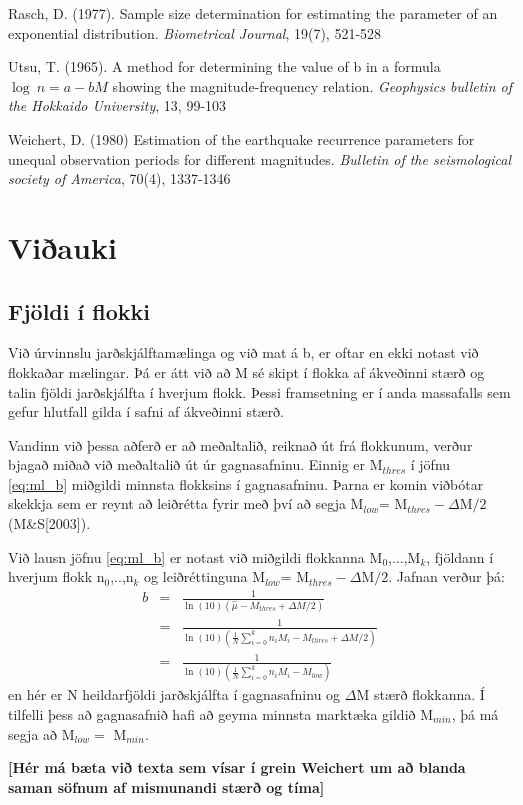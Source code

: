 \documentclass[10pt,a4paper,titlepage,twoside]{article}
\newcommand{\note}[1]{\textcolor{ymagray}{\textbf{[#1]}}}
\begin{document}
Rasch, D. (1977). Sample size determination for estimating the parameter of an exponential distribution. \textit{Biometrical Journal}, 19(7), 521-528

Utsu, T. (1965). A method for determining the value of b in a formula $\log~n=a-bM$ showing the magnitude-frequency relation. \textit{Geophysics bulletin of the Hokkaido University}, 13, 99-103

Weichert, D. (1980) Estimation of the earthquake recurrence parameters for unequal observation periods for different magnitudes. \textit{Bulletin of the seismological society of America}, 70(4), 1337-1346





\clearpage
\section{Viðauki}

\subsection{Fjöldi í flokki}\label{fj_flokki}

Við úrvinnslu jarðskjálftamælinga og við mat á b, er oftar en ekki notast við flokkaðar mælingar. Þá er átt við að M sé skipt í flokka af ákveðinni stærð og talin fjöldi jarðskjálfta í hverjum flokk. Þessi framsetning er í anda massafalls sem gefur hlutfall gilda í safni af ákveðinni stærð.

Vandinn við þessa aðferð er að meðaltalið, reiknað út frá flokkunum, verður bjagað miðað við meðaltalið út úr gagnasafninu. Einnig er M$_{thres}$ í jöfnu \ref{eq:ml_b} miðgildi minnsta flokksins í gagnasafninu. Þarna er komin viðbótar skekkja sem er reynt að leiðrétta fyrir með því að segja M$_{low}$= M$_{thres}-\Delta$M$/2$ (M\&S[2003]).

Við lausn jöfnu \ref{eq:ml_b} er notast við miðgildi flokkanna M$_0$,...,M$_k$, fjöldann í hverjum flokk n$_0$,..,n$_k$ og leiðréttinguna M$_{low}$= M$_{thres}-\Delta$M$/2$. Jafnan verður þá:
\begin{eqnarray}
b & = & \frac{1}{\ln(10)(\hat{\mu} - M_{thres}+\Delta M/2)}\nonumber\\
  & = & \frac{1}{\ln(10)\left(\frac{1}{N}\sum_{i=0}^k n_iM_i - M_{thres} + \Delta M/2\right)}\nonumber\\
  & = & \frac{1}{\ln(10)\left(\frac{1}{N}\sum_{i=0}^k n_iM_i - M_{low}\right)}
\end{eqnarray}
en hér er N heildarfjöldi jarðskjálfta í gagnasafninu og $\Delta$M stærð flokkanna. Í tilfelli þess að gagnasafnið hafi að geyma minnsta marktæka gildið M$_{min}$, þá má segja að M$_{low}=$ M$_{min}$.



\note{Hér má bæta við texta sem vísar í grein Weichert um að blanda saman söfnum af mismunandi stærð og tíma}


\fi
\end{document}

